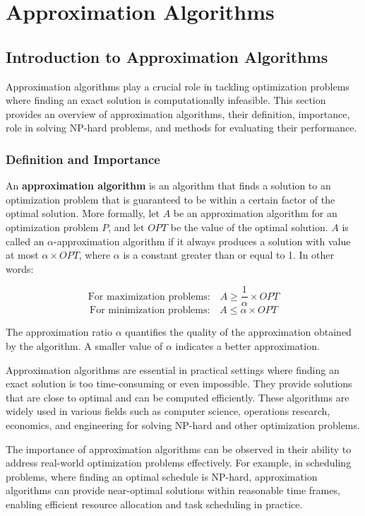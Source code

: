 \documentclass[12pt]{book} %
\begin{document}
\chapter{Approximation Algorithms}

\section{Introduction to Approximation Algorithms}

Approximation algorithms play a crucial role in tackling optimization problems where finding an exact solution is computationally infeasible. This section provides an overview of approximation algorithms, their definition, importance, role in solving NP-hard problems, and methods for evaluating their performance.

\subsection{Definition and Importance}

An \textbf{approximation algorithm} is an algorithm that finds a solution to an optimization problem that is guaranteed to be within a certain factor of the optimal solution. More formally, let \(A\) be an approximation algorithm for an optimization problem \(P\), and let \(OPT\) be the value of the optimal solution. \(A\) is called an \(\alpha\)-approximation algorithm if it always produces a solution with value at most \(\alpha \times OPT\), where \(\alpha\) is a constant greater than or equal to 1. In other words:

\[
\text{For maximization problems:} \quad A \geq \frac{1}{\alpha} \times OPT
\]
\[
\text{For minimization problems:} \quad A \leq \alpha \times OPT
\]

The approximation ratio \(\alpha\) quantifies the quality of the approximation obtained by the algorithm. A smaller value of \(\alpha\) indicates a better approximation.

Approximation algorithms are essential in practical settings where finding an exact solution is too time-consuming or even impossible. They provide solutions that are close to optimal and can be computed efficiently. These algorithms are widely used in various fields such as computer science, operations research, economics, and engineering for solving NP-hard and other optimization problems.

The importance of approximation algorithms can be observed in their ability to address real-world optimization problems effectively. For example, in scheduling problems, where finding an optimal schedule is NP-hard, approximation algorithms can provide near-optimal solutions within reasonable time frames, enabling efficient resource allocation and task scheduling in practice.
\end{document}
